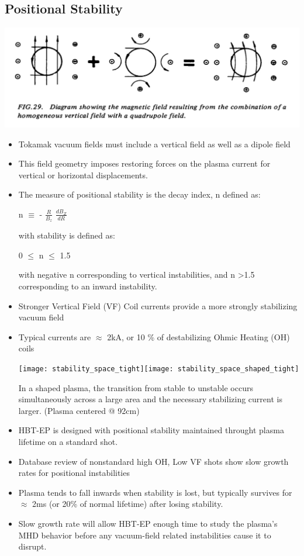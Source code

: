\documentclass{article}
\begin{document}
\begin{multicols}{5}
\section*{Positional Stability}
\includegraphics[width =0.9\columnwidth]{vacuumfield}\\
\begin{itemize}
\item Tokamak vacuum fields must include a vertical field as well as a dipole field
\item This field geometry imposes restoring forces on the plasma current for vertical or horizontal displacements.
\item The measure of positional stability is the decay index, n defined as:
\begin{center}
n $\equiv$ - $\frac{R}{B_z}$ $\frac{dB_Z}{dR}$
\end{center}
with stability is defined as:

\begin{center}
0 $\le$ n $\le$ 1.5
\end{center}

with negative n corresponding to vertical instabilities, and n \textgreater  1.5 corresponding to an inward instability.

\item Stronger Vertical Field (VF) Coil currents provide a more strongly stabilizing vacuum field
\item Typical currents are $\approx$ 2kA, or 10 \% of destabilizing Ohmic Heating (OH) coils

\texttt{[image: stability\_space\_tight]}\texttt{[image: stability\_space\_shaped\_tight]}
\begin {center}
In a shaped plasma, the transition from stable to unstable occurs simultaneously across a large area and the necessary stabilizing current is larger. (Plasma centered @ 92cm)\\

\end{center}

\item HBT-EP is designed with positional stability maintained throught plasma lifetime on a standard shot.
\item Database review of nonstandard high OH, Low VF shots show slow growth rates for positional instabilities
\item Plasma tends to fall inwards when stability is lost, but typically survives for $\approx$ 2ms (or 20\% of normal lifetime) after losing stability.  
\item Slow growth rate will allow HBT-EP enough time to study the plasma's MHD behavior before any vacuum-field related instabilities cause it to disrupt.\\


\end{itemize}
\end{multicols}
\end{document}
